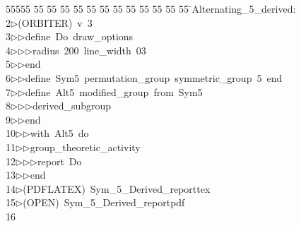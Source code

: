 %
%
\begin{tabbing}
55555 \= 55 \= 55 \= 55 \= 55 \= 55 \= 55 \= 55 \= 55 \= 55 \= 55 \= 55 \= 55 \= \>Alternating\_5\_derived:\\[0pt]
2\>$\triangleright$\>(ORBITER)\ v\ 3\ \\[0pt]
3\>$\triangleright$\>$\triangleright$\>define\ Do\ draw\_options\ \\[0pt]
4\>$\triangleright$\>$\triangleright$\>$\triangleright$\>radius\ 200\ line\_width\ 03\ \\[0pt]
5\>$\triangleright$\>$\triangleright$\>end\ \\[0pt]
6\>$\triangleright$\>$\triangleright$\>define\ Sym5\ permutation\_group\ symmetric\_group\ 5\ end\ \\[0pt]
7\>$\triangleright$\>$\triangleright$\>define\ Alt5\ modified\_group\ from\ Sym5\ \\[0pt]
8\>$\triangleright$\>$\triangleright$\>$\triangleright$\>derived\_subgroup\ \\[0pt]
9\>$\triangleright$\>$\triangleright$\>end\ \\[0pt]
10\>$\triangleright$\>$\triangleright$\>with\ Alt5\ do\ \\[0pt]
11\>$\triangleright$\>$\triangleright$\>group\_theoretic\_activity\ \\[0pt]
12\>$\triangleright$\>$\triangleright$\>$\triangleright$\>report\ Do\ \\[0pt]
13\>$\triangleright$\>$\triangleright$\>end\\[0pt]
14\>$\triangleright$\>(PDFLATEX)\ Sym\_5\_Derived\_reporttex\\[0pt]
15\>$\triangleright$\>(OPEN)\ Sym\_5\_Derived\_reportpdf\\[0pt]
16\>\end{tabbing}
